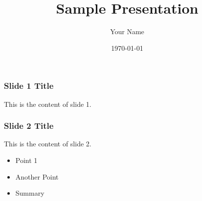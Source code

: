 \documentclass{beamer}
\title{Sample Presentation}
\author{Your Name}
\date{\today}
\begin{document}
\begin{frame}
    \titlepage
\end{frame}

\begin{frame}
    \frametitle{Slide 1 Title}
    
    \Large
    This is the content of slide 1.

\end{frame}

\begin{frame}
    \frametitle{Slide 2 Title}
    This is the content of slide 2.
    
    \begin{itemize}
        \item Point 1
        \item Another Point
        \item Summary
    \end{itemize}

\end{frame}
\end{document}
